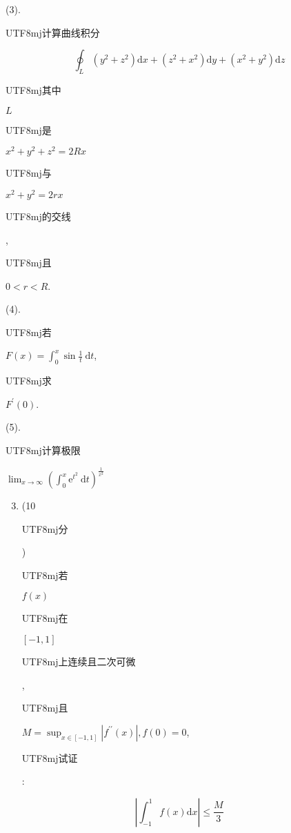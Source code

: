 \documentclass[10pt]{article}
\begin{document}
(3). \begin{CJK}{UTF8}{mj}计算曲线积分\end{CJK}
$$
\oint_{L}\left(y^{2}+z^{2}\right) \mathrm{d} x+\left(z^{2}+x^{2}\right) \mathrm{d} y+\left(x^{2}+y^{2}\right) \mathrm{d} z
$$
\begin{CJK}{UTF8}{mj}其中\end{CJK} $L$ \begin{CJK}{UTF8}{mj}是\end{CJK} $x^{2}+y^{2}+z^{2}=2 R x$ \begin{CJK}{UTF8}{mj}与\end{CJK} $x^{2}+y^{2}=2 r x$ \begin{CJK}{UTF8}{mj}的交线\end{CJK}, \begin{CJK}{UTF8}{mj}且\end{CJK} $0<r<R$.

(4). \begin{CJK}{UTF8}{mj}若\end{CJK} $F(x)=\int_{0}^{x} \sin \frac{1}{t} \mathrm{~d} t$, \begin{CJK}{UTF8}{mj}求\end{CJK} $F^{\prime}(0)$.

(5). \begin{CJK}{UTF8}{mj}计算极限\end{CJK} $\lim _{x \rightarrow \infty}\left(\int_{0}^{x} \mathrm{e}^{t^{2}} \mathrm{~d} t\right)^{\frac{1}{x^{2}}}$

\begin{enumerate}
  \setcounter{enumi}{2}
  \item (10 \begin{CJK}{UTF8}{mj}分\end{CJK}) \begin{CJK}{UTF8}{mj}若\end{CJK} $f(x)$ \begin{CJK}{UTF8}{mj}在\end{CJK} $[-1,1]$ \begin{CJK}{UTF8}{mj}上连续且二次可微\end{CJK}, \begin{CJK}{UTF8}{mj}且\end{CJK} $M=\sup _{x \in[-1,1]}\left|f^{\prime \prime}(x)\right|, f(0)=0$, \begin{CJK}{UTF8}{mj}试证\end{CJK}:
\end{enumerate}
$$
\left|\int_{-1}^{1} f(x) \mathrm{d} x\right| \leq \frac{M}{3}
$$
\end{document}
